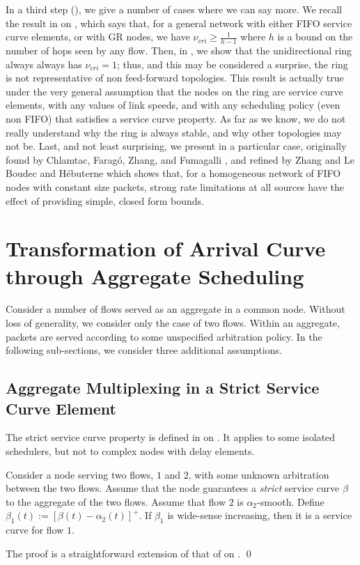 In a third step (), we give a number of cases
where we can say more. We recall the result in
 on , which says
that, for a general network with either FIFO service curve
elements, or with GR nodes, we have $\nu_{cri} \geq \frac{1}{h-1}$
where $h$ is a bound on the number of hops seen by any flow. Then,
in , we show that the unidirectional ring
always always has $\nu_{cri} = 1$; thus, and this may be
considered a surprise, the ring is not representative of non
feed-forward topologies. This result is actually true under the
very general assumption that the nodes on the ring are service
curve elements, with any values of link speeds, and with any
scheduling policy (even non FIFO) that satisfies a service curve
property. As far as we know, we do not really understand why the
ring is always stable, and why other topologies may not be. Last,
and not least surprising, we present in  a
particular case, originally found by Chlamtac, Farag\'o, Zhang,
and Fumagalli \cite{CFZF98}, and refined by Zhang \cite{zhang99}
and Le Boudec and H\'{e}buterne \cite{leb99} which shows that, for
a homogeneous network of FIFO nodes with constant size packets,
strong rate limitations at all sources have the effect of
providing simple, closed form bounds.

\section{Transformation of Arrival Curve through Aggregate Scheduling}

Consider a number of flows served as an aggregate in a common
node. Without loss of generality, we consider only the case of two
flows. Within an aggregate, packets are served according to some
unspecified arbitration policy. In the following sub-sections, we
consider three additional assumptions.

\subsection{Aggregate Multiplexing in a Strict Service Curve Element}
 The strict service curve property is defined
in  on . It applies to some isolated
schedulers, but not to complex nodes with delay elements.
\begin{theorem}
Consider a node serving two flows, $1$ and $2$, with some unknown
arbitration between the two flows. Assume that the node guarantees
a \emph{strict} service curve $\beta$ to the aggregate of the two
flows. Assume that flow $2$ is $\alpha_2$-smooth. Define
$\beta_1(t):=[\beta(t) - \alpha_2(t)]^+$. If $\beta_1$ is
wide-sense increasing, then it is a service curve for flow $1$.
 \end{theorem}
 \pr
 The proof is a straightforward extension of that of  on .
\qed

